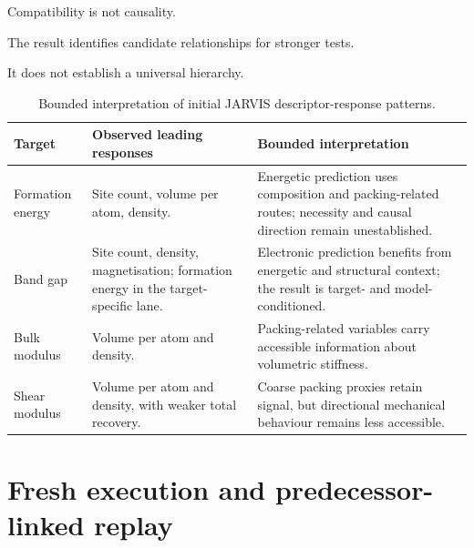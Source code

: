 \documentclass[11pt,a4paper,oneside]{report}
\begin{document}
Compatibility is not causality.



The result identifies candidate relationships for stronger tests.



It does not establish a universal hierarchy.





\begin{table}[H]



\centering



\caption{Bounded interpretation of initial JARVIS descriptor-response patterns.}



\label{tab:jarvis-descriptor-patterns}



\begin{tabularx}{\textwidth}{L{0.20\textwidth}
    L{0.28\textwidth}
    Y
}
\toprule
\textbf{Target}
&
\textbf{Observed leading responses}
&
\textbf{Bounded interpretation}
\\
\midrule
Formation energy
&
Site count,
volume per atom,
density.
&
Energetic prediction uses composition and packing-related routes;
necessity and causal direction remain unestablished.
\\
\addlinespace
Band gap
&
Site count,
density,
magnetisation;
formation energy in the target-specific lane.
&
Electronic prediction benefits from energetic and structural context;
the result is target- and model-conditioned.
\\
\addlinespace
Bulk modulus
&
Volume per atom and density.
&
Packing-related variables carry accessible information about
volumetric stiffness.
\\
\addlinespace
Shear modulus
&
Volume per atom and density,
with weaker total recovery.
&
Coarse packing proxies retain signal,
but directional mechanical behaviour remains less accessible.
\\
\bottomrule
\end{tabularx}



\end{table}





\section{Fresh execution and predecessor-linked replay}
\end{document}
